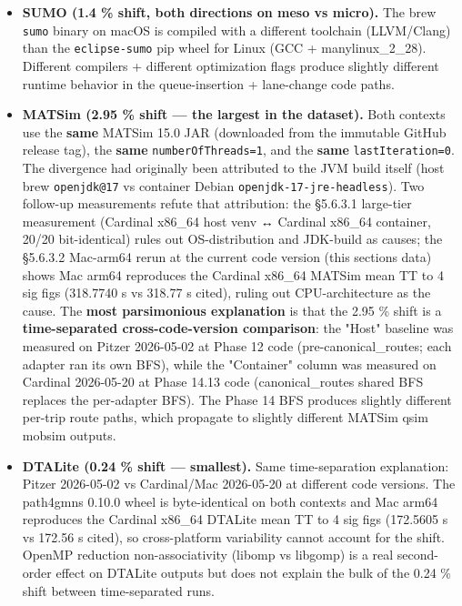 \begin{itemize}
\tightlist
\item
  \textbf{SUMO (1.4 \% shift, both directions on meso vs micro).} The
  brew \texttt{sumo} binary on macOS is compiled with a different
  toolchain (LLVM/Clang) than the \texttt{eclipse-sumo} pip wheel for
  Linux (GCC + manylinux\_2\_28). Different compilers + different
  optimization flags produce slightly different runtime behavior in the
  queue-insertion + lane-change code paths.
\item
  \textbf{MATSim (2.95 \% shift --- the largest in the dataset).} Both
  contexts use the \textbf{same} MATSim 15.0 JAR (downloaded from the
  immutable GitHub release tag), the \textbf{same}
  \texttt{numberOfThreads=1}, and the \textbf{same}
  \texttt{lastIteration=0}. The divergence had originally been
  attributed to the JVM build itself (host brew \texttt{openjdk@17} vs
  container Debian \texttt{openjdk-17-jre-headless}). Two follow-up
  measurements refute that attribution: the §5.6.3.1 large-tier
  measurement (Cardinal x86\_64 host venv ↔ Cardinal x86\_64 container,
  20/20 bit-identical) rules out OS-distribution and JDK-build as
  causes; the §5.6.3.2 Mac-arm64 rerun at the current code version (this
  section\textquotesingle s data) shows Mac arm64 reproduces the
  Cardinal x86\_64 MATSim mean TT to 4 sig figs (318.7740 s vs 318.77 s
  cited), ruling out CPU-architecture as the cause. The \textbf{most
  parsimonious explanation} is that the 2.95 \% shift is a
  \textbf{time-separated cross-code-version comparison}: the "Host"
  baseline was measured on Pitzer 2026-05-02 at Phase 12 code
  (pre-canonical\_routes; each adapter ran its own BFS), while the
  "Container" column was measured on Cardinal 2026-05-20 at Phase 14.13
  code (canonical\_routes shared BFS replaces the per-adapter BFS). The
  Phase 14 BFS produces slightly different per-trip route paths, which
  propagate to slightly different MATSim qsim mobsim outputs.
\item
  \textbf{DTALite (0.24 \% shift --- smallest).} Same time-separation
  explanation: Pitzer 2026-05-02 vs Cardinal/Mac 2026-05-20 at different
  code versions. The path4gmns 0.10.0 wheel is byte-identical on both
  contexts and Mac arm64 reproduces the Cardinal x86\_64 DTALite mean TT
  to 4 sig figs (172.5605 s vs 172.56 s cited), so cross-platform
  variability cannot account for the shift. OpenMP reduction
  non-associativity (libomp vs libgomp) is a real second-order effect on
  DTALite outputs but does not explain the bulk of the 0.24 \% shift
  between time-separated runs.
\end{itemize}

